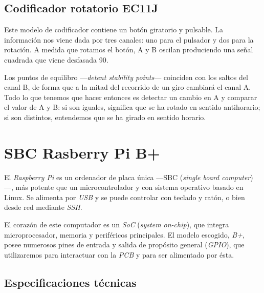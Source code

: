 \subsection{Codificador rotatorio EC11J}

Este modelo de codificador contiene un botón giratorio y pulsable. La información nos viene dada por tres canales: uno para el pulsador y dos para la rotación. A medida que rotamos el botón, A y B oscilan produciendo una señal cuadrada que viene desfasada 90\textdegree. 

Los puntos de equilibro ---\textit{detent stability points}--- coinciden con los saltos del canal B, de forma que a la mitad del recorrido de un giro cambiará el canal A. Todo lo que tenemos que hacer entonces es detectar un cambio en A y comparar el valor de A y B: si son iguales, significa que se ha rotado en sentido antihorario; si son distintos, entendemos que se ha girado en sentido horario.

\section{SBC Rasberry Pi B+}

El \textit{Raspberry Pi} es un ordenador de placa única ---SBC (\textit{single board computer})---, más potente que un microcontrolador y con sistema operativo basado en Linux. Se alimenta por \textit{USB} y se puede controlar con teclado y ratón, o bien desde red mediante \textit{SSH}. 

El corazón de este computador es un \textit{SoC} (\textit{system on-chip}), que integra microprocesador, memoria y periféricos principales. El modelo escogido, \textit{B+}, posee numerosos pines de entrada y salida de propósito general (\textit{GPIO}), que utilizaremos para interactuar con la \textit{PCB} y para ser alimentado por ésta.

\subsection{Especificaciones técnicas}

